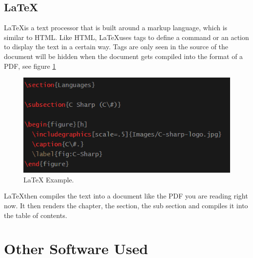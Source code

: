 \newpage
\subsection{\LaTeX}
\LaTeX \space is a text processor that is built around a markup language, which is similar to HTML.
Like HTML, \LaTeX \space uses tags to define a command or an action to display the text in a certain way. Tags are only seen in the source of the document will be hidden when the document gets compiled into the format of a PDF, see figure \ref{fig:LaTeXExample}
\begin{figure}[h]
  \includegraphics[width=\linewidth]{Images/Latex-example.PNG}
  \caption{LaTeX Example.}
  \label{fig:LaTeXExample}
\end{figure}
\bigskip
\newline
\LaTeX \space then compiles the text into a document like the PDF you are reading right now. It then renders the chapter, the section, the sub section and compiles it into the table of contents.\cite{LaTeX}

\newpage

\section{Other Software Used}
